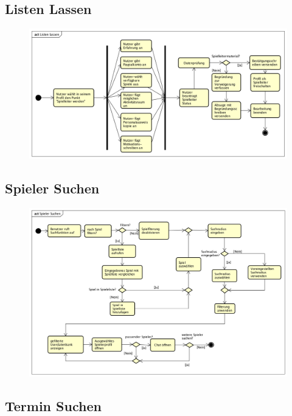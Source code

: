 \vfill

\subsection*{Listen Lassen}
\begin{figure}[h!]
	\centering
	\includegraphics[width=0.8\linewidth]{docs/3_Aktivitaetsdiagramme/Markus/Listen_Lassen.png}
	\label{fig:ActDia_Listen_Lassen}
\end{figure}

\vfill

\pagebreak

\vfill

\subsection*{Spieler Suchen}
\begin{figure}[h!]
	\centering
	\includegraphics[width=0.8\linewidth]{docs/3_Aktivitaetsdiagramme/Markus/Spieler_Suchen.png}
	\label{fig:ActDia_Spieler_Suchen}
\end{figure}

\vfill

\subsection*{Termin Suchen}
\begin{figure}[h!]
	\centering
	\label{fig:ActDia_Termin_Suchen}
\end{figure}

\vfill

\pagebreak
